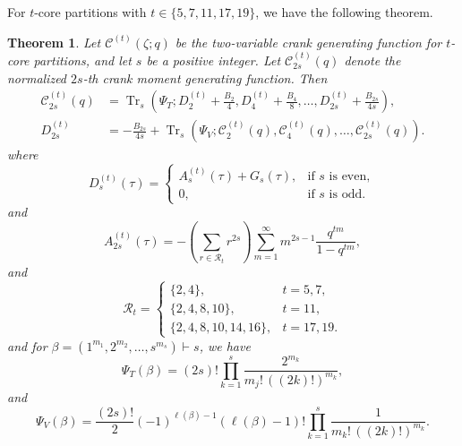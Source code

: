 \documentclass[12pt,oneside,reqno]{amsart}
\numberwithin{equation}{section}
\newtheorem{theorem}{Theorem}[section]
\begin{document}
For $t$-core partitions with $t\in\{5,7,11,17,19\}$, we have the following theorem.
	\begin{theorem}\label{th1} 
	Let $\mathcal{C}^{(t)}(\zeta;q)$ be the two-variable crank generating 
	function for $t$-core partitions, and let $s$ be a positive integer. 
	Let $\mathcal{C}^{(t)}_{2s}(q)$ denote the normalized $2s$-th crank 
	moment generating function. Then 
	\begin{equation}\label{eq:5} 
		\begin{aligned} 
			\mathcal{C}_{2s}^{(t)}(q) 
			&= 
			\operatorname{Tr}_s 
			\left( 
			\Psi_T; 
			D^{(t)}_{2}+\frac{B_2}{4}, 
			D^{(t)}_{4}+\frac{B_4}{8}, 
			\ldots, 
			D^{(t)}_{2s}+\frac{B_{2s}}{4s} 
			\right),\\ 
			D^{(t)}_{2s} 
			&= 
			-\frac{B_{2s}}{4s} 
			+ 
			\operatorname{Tr}_s 
			\left( 
			\Psi_V; 
			\mathcal{C}_2^{(t)}(q), 
			\mathcal{C}_4^{(t)}(q), 
			\ldots, 
			\mathcal{C}_{2s}^{(t)}(q) 
			\right). 
		\end{aligned} 
	\end{equation} 
	where 
	\begin{equation*} 
		D^{(t)}_{s}(\tau) 
		= 
		\begin{cases} 
			A^{(t)}_{s}(\tau)+G_s(\tau), 
			& \text{if $s$ is even},\\[4pt] 
			0, 
			& \text{if $s$ is odd}. 
		\end{cases} 
	\end{equation*} 
	and 
	\begin{equation}\label{eq:At} 
		A^{(t)}_{2s}(\tau) 
		= 
		-\left(\sum_{r\in\mathcal{R}_t}r^{2s}\right) 
		\sum_{m=1}^{\infty} 
		m^{2s-1}\frac{q^{tm}}{1-q^{tm}}, 
	\end{equation} 
	and
	\[ 
	\mathcal{R}_t 
	= 
	\begin{cases} 
		\{2,4\}, & t=5,7,\\[2pt] 
		\{2,4,8,10\}, & t=11,\\[2pt] 
		\{2,4,8,10,14,16\}, & t=17,19. 
	\end{cases} 
	\] 
	and for $\beta=(1^{m_1},2^{m_2},\ldots,s^{m_s})\vdash s$, we have 
	\begin{equation*} 
		\Psi_T(\beta) 
		= 
		(2s)! 
		\prod_{k=1}^{s} 
		\frac{2^{m_k}} 
		{m_j!\,((2k)!)^{m_k}}, 
	\end{equation*} 
	and 
	\begin{equation*} 
		\Psi_V(\beta) 
		= 
		\frac{(2s)!}{2} 
		(-1)^{\ell(\beta)-1} 
		(\ell(\beta)-1)! 
		\prod_{k=1}^{s} 
		\frac{1} 
		{m_k!\,((2k)!)^{m_k}}. 
	\end{equation*} 
\end{theorem} 
\end{document}

